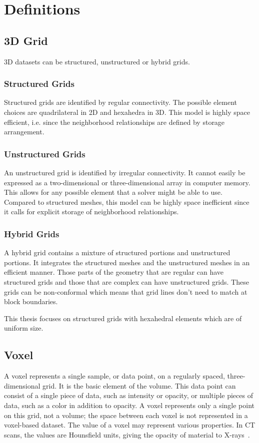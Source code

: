\section{Definitions}

\subsection{3D Grid}
3D datasets can be structured, unstructured or hybrid grids.

\subsubsection{Structured Grids} Structured grids are identified by regular connectivity. The possible element choices are quadrilateral in 2D and hexahedra in 3D. This model is highly space efficient, i.e. since the neighborhood relationships are defined by storage arrangement.

\subsubsection{Unstructured Grids} An unstructured grid is identified by irregular connectivity. It cannot easily be expressed as a two-dimensional or three-dimensional array in computer memory. This allows for any possible element that a solver might be able to use. Compared to structured meshes, this model can be highly space inefficient since it calls for explicit storage of neighborhood relationships.

\subsubsection{Hybrid Grids} A hybrid grid contains a mixture of structured portions and unstructured portions. It integrates the structured meshes and the unstructured meshes in an efficient manner. Those parts of the geometry that are regular can have structured grids and those that are complex can have unstructured grids. These grids can be non-conformal which means that grid lines don’t need to match at block boundaries.

This thesis focuses on structured grids with hexahedral elements which are of uniform size.

\subsection{Voxel}
A voxel represents a single sample, or data point, on a regularly spaced, three-dimensional grid.  It is the basic element of the volume. This data point can consist of a single piece of data, such as intensity or opacity, or multiple pieces of data, such as a color in addition to opacity. A voxel represents only a single point on this grid, not a volume; the space between each voxel is not represented in a voxel-based dataset. The value of a voxel may represent various properties. In CT scans, the values are Hounsfield units, giving the opacity of material to X-rays~\cite{nov}.


